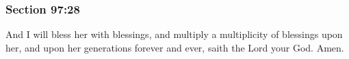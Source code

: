 	\subsubsection{Section 97:28} %
		\label{DC97-28}

		And I will bless her with blessings, and multiply a multiplicity of blessings upon her, and upon her generations forever and ever, saith the Lord your God.  Amen.

